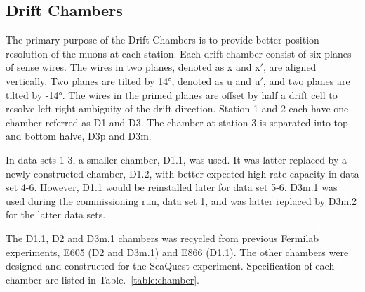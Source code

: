 \documentclass[../main.tex]{subfiles}
\begin{document}
\subsection{Drift Chambers}
The primary purpose of the Drift Chambers is to provide better position resolution of the muons
at each station. Each drift chamber consist of six planes of sense wires. The wires in two planes,
denoted as x and x$'$, are aligned vertically. Two planes are tilted by \ang[retain-explicit-plus]{+14},
denoted as u and u$'$, and two planes are tilted by \ang[retain-explicit-plus]{-14}. The wires
in the primed planes are offset by half a drift cell to resolve left-right ambiguity of the
drift direction. Station 1 and 2 each have one chamber referred as D1 and D3. The chamber at station
3 is separated into top and bottom halve, D3p and D3m.

In data sets 1-3, a smaller chamber, D1.1, was used. It was latter replaced by a newly constructed
chamber, D1.2, with better expected high rate capacity in data set 4-6. However, D1.1 would be 
reinstalled later for data set 5-6. D3m.1 was used during the commissioning run, data set 1, and
was latter replaced by D3m.2 for the latter data sets.

The D1.1, D2 and D3m.1 chambers was recycled from previous Fermilab experiments, E605 (D2 and D3m.1)
and E866 (D1.1). The other chambers were designed and constructed for the SeaQuest experiment.
Specification of each chamber are listed in Table.~\ref{table:chamber}.
\end{document}
